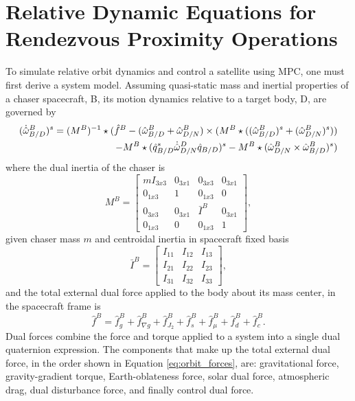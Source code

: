 \documentclass[letterpaper, preprint, paper,11pt]{AAS}	%
\begin{document}
\section{Relative Dynamic Equations for Rendezvous Proximity Operations}
To simulate relative orbit dynamics and control a satellite using MPC, one must first derive a system model. Assuming quasi-static mass and inertial properties of a chaser spacecraft, B, its motion dynamics relative to a target body, D, are governed by
\begin{equation}
\begin{aligned}
	\label{eq:dyn}
	(\dot{\hat{\omega}}^B_{B/D})^s = (M^B)^{-1}\star(\hat{f}^B-(\hat{\omega}^B_{B/D}+\hat{\omega}^B_{D/N})\times(M^B\star((\hat{\omega}^B_{B/D})^s+(\hat{\omega}^B_{D/N})^s))\\-M^B\star(\hat{q}^*_{B/D}\dot{\hat{\omega}}^D_{D/N}\hat{q}_{B/D})^s-M^B\star(\hat{\omega}^B_{D/N}\times\hat{\omega}^B_{B/D})^s)
\end{aligned}\\
\end{equation}
where the dual inertia of the chaser is
\begin{equation}
\label{eq:dual_inertia}
M^B = 
\begin{bmatrix} 
mI_{3x3} & 0_{3x1} & 0_{3x3} & 0_{3x1} \\ 
0_{1x3} & 1 & 0_{1x3} & 0 \\ 
0_{3x3} & 0_{3x1} & \bar{I}^B & 0_{3x1} \\ 
0_{1x3} & 0 & 0_{1x3} & 1 
\end{bmatrix}, 
\end{equation}
given chaser mass $m$ and centroidal inertia in spacecraft fixed basis
\begin{equation}
\label{eq:sc_inertia}
\bar{I}^B = 
\begin{bmatrix} 
I_{11} & I_{12}& I_{13} \\ 
I_{21} & I_{22}& I_{23}\\ 
I_{31} & I_{32}& I_{33}
\end{bmatrix},
\end{equation}
and the total external dual force applied to the body about its mass center, in the spacecraft frame is
\begin{equation}
\label{eq:orbit_forces}
\hat{f}^B = \hat{f}^B_g + \hat{f}^B_{\nabla g} + \hat{f}^B_{J_2} +\hat{f}^B_{s}+\hat{f}^B_{\mu} + \hat{f}^B_d + \hat{f}^B_c.
\end{equation}
Dual forces combine the force and torque applied to a system into a single dual quaternion expression. The components that make up the total external dual force, in the order shown in Equation \eqref{eq:orbit_forces}, are: gravitational force, gravity-gradient torque, Earth-oblateness force, solar dual force, atmospheric drag, dual disturbance force, and finally control dual force.
\end{document}
